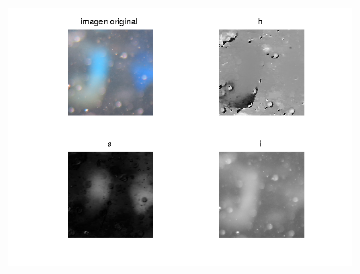 \documentclass{article}
\begin{document}
\begin{figure}[H]
	\centering
	\begin{subfigure}{0.5\textwidth}
	\centering
        \includegraphics[scale=0.6]{im12.png}
    \end{subfigure}\hfill
\end{figure}\hfill
\end{document}
